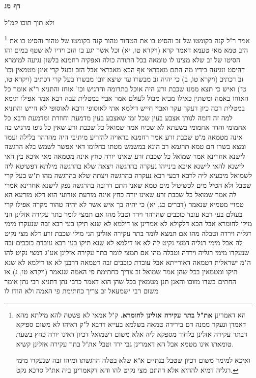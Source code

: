 \documentclass[12pt, openany]{book}
\newcommand{\sethebfont}{
\fontsize{10.5pt}{21.0pt} \selectfont
}
\newcommand{\twocol}[1]{
	{\sethebfont \begin{multicols}{2}
			#1
	\end{multicols}}	
}
\newcommand{\sectname}{}
\newcommand{\newsection}[1]{
	\addcontentsline{toc}{section}{#1}
	\renewcommand{\sectname}{#1}	
	\vspace{-\baselineskip}
	\begin{center}
		\textbf{%
\fontsize{16pt}{16pt}\selectfont
			#1}
	\end{center}
	\vspace{-\baselineskip}
	\nopagebreak
}
\newcommand{\footnotecomment}[1]{
	\renewcommand\thefootnote{}
	\footnote{#1}}
\newcommand{\commenta}[1]{\footnotecomment{#1}}
\begin{document}
\newsection{דף מג}
\twocol{ולא תוך תוכו קמ"ל 
\commenta{הא דאמרינן \textbf{את"ל בתר עקירה אזלינן לחומרא.} ק"ל אמאי לא פשטה להא מילתא מהא דאמרן ונעקר ממנה דם בירידה טמאה בשלמא בעייא דרבא ל"ק דאיהו לא משום ספיקא דבתר עקירה אזלינן בלחוד מספקא ליה אלא משום דשמואל דכיון דאינו יורה כחץ בשעת טומאתו אינו מטמא אבל הא דאמרינן גבי ירד וטבל את"ל בתר עקירה אזלינן קשיא.\par ואיכא למימר משום דכיון שטבל בנתיים א"א שלא בטלה הרגשתו ומיהו זבה שנעקרו מימי רגליה דמיא לההיא אלא דהתם מצי נקיט להו והא דקאמרינן ביה את"ל סרכא נקט. }
אמר ר"ל קנה בקומטו של זב והסיט בו את הטהור טהור קנה בקומטו של טהור והסיט בו את הזב טמא 
מאי טעמא דאמר קרא (ויקרא טו, יא) וכל אשר יגע בו הזב וידיו לא שטף במים זהו הסיטו של זב שלא מצינו לו טומאה בכל התורה כולה 
ואפקיה רחמנא בלשון נגיעה למימרא דהיסט ונגיעה כידיו מה התם מאבראי אף הכא מאבראי
אבל הזב ובעל קרי אינן מטמאין וכו' זב דכתיב (ויקרא טו, ב) כי יהיה זב מבשרו עד שיצא זובו מבשרו בעל קרי דכתיב (ויקרא טו, טז) ואיש כי תצא ממנו שכבת זרע
היה אוכל בתרומה והרגיש וכו' אוחז והתניא ר"א אומר כל האוחז באמה ומשתין כאילו מביא מבול לעולם 
אמר אביי במטלית עבה רבא אמר אפילו תימא במטלית רכה כיון דעקר עקר ואביי חייש דילמא אתי לאוסופי ורבא לאוסופי לא חייש 
והתניא למה זה דומה לנותן אצבע בעין שכל זמן שאצבע בעין מדמעת וחוזרת ומדמעת 
ורבא כל אחמומי והדר אחמומי בשעתא לא שכיח 
אמר שמואל כל שכבת זרע שאין כל גופו מרגיש בה אינה מטמאה מ"ט שכבת זרע אמר רחמנא בראויה להזריע 
מיתיבי היה מהרהר בלילה ועמד ומצא בשרו חם טמא תרגמא רב הונא במשמש מטתו בחלומו דאי אפשר לשמש בלא הרגשה 
לישנא אחרינא אמר שמואל כל שכבת זרע שאינו יורה כחץ אינה מטמאה מאי איכא בין האי לישנא להאי לישנא איכא בינייהו נעקרה בהרגשה ויצאה שלא בהרגשה 
מילתא דפשיטא ליה לשמואל מיבעיא ליה לרבא דבעי רבא נעקרה בהרגשה ויצתה שלא בהרגשה מהו 
ת"ש בעל קרי שטבל ולא הטיל מים לכשיטיל מים טמא שאני התם דרובה בהרגשה נפק 
לישנא אחרינא אמרי לה אמר שמואל כל שכבת זרע שאינו יורה כחץ אינה מזרעת אזרועי הוא דלא מזרעא הא טמויי מטמיא שנאמר (דברים כג, יא) כי יהיה בך איש אשר לא יהיה טהור מקרה אפילו קרי בעולם 
בעי רבא עובד כוכבים שהרהר וירד וטבל מהו 
אם תמצי לומר בתר עקירה אזלינן הני מילי לחומרא אבל הכא דלקולא לא אמרינן או דילמא לא שנא תיקו 
בעי רבא זבה שנעקרו מימי רגליה וירדה וטבלה מהו 
אם תמצא לומר בתר עקירה אזלינן הני מילי שכבת זרע דלא מצי נקיט לה אבל מימי רגליה דמצי נקיט לה לא או דילמא לא שנא תיקו 
בעי רבא עובדת כוכבים זבה שנעקרו מימי רגליה
וירדה וטבלה מהו 
אם תמצי לומר בתר עקירה אזלינן אע"ג דמצי נקיט להו ה"מ ישראלית דטמאה דאורייתא אבל עובדת כוכבים זבה דטמאה דרבנן לא או דילמא לא שנא תיקו
ומטמאין בכל שהן אמר שמואל זב צריך כחתימת פי האמה שנאמר (ויקרא טו, ג) או החתים בשרו מזובו 
והאנן תנן מטמאין בכל שהן הוא דאמר כרבי נתן דתניא רבי נתן אומר משום רבי ישמעאל זב צריך כחתימת פי האמה ולא הודו לו 
}
\end{document}
